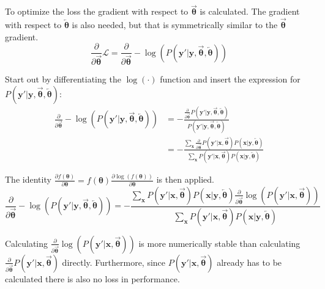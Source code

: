 To optimize the loss the gradient with respect to $\overrightarrow{\boldsymbol\theta}$ is calculated. The gradient with respect to $\overleftarrow{\boldsymbol\theta}$ is also needed, but that is symmetrically similar to the $\overrightarrow{\boldsymbol\theta}$ gradient.
\begin{equation}
\frac{\partial}{\partial \overrightarrow{\boldsymbol\theta}} \mathcal{L} = \frac{\partial}{\partial \overrightarrow{\boldsymbol\theta}} -\log(P(\mathbf{y}'|\mathbf{y}, \overrightarrow{\boldsymbol\theta}, \overleftarrow{\boldsymbol\theta}))
\end{equation}

Start out by differentiating the $\log(\cdot)$ function and insert the expression for $P(\mathbf{y}'|\mathbf{y}, \overrightarrow{\boldsymbol\theta}, \overleftarrow{\boldsymbol\theta})$:
\begin{equation}
\begin{aligned}
\frac{\partial}{\partial \overrightarrow{\boldsymbol\theta}} -\log(P(\mathbf{y}'|\mathbf{y}, \overrightarrow{\boldsymbol\theta}, \overleftarrow{\boldsymbol\theta}))
&= - \frac{\frac{\partial}{\partial \overrightarrow{\boldsymbol\theta}} P(\mathbf{y}'|\mathbf{y}, \overrightarrow{\boldsymbol\theta}, \overleftarrow{\boldsymbol\theta})}{P(\mathbf{y}'|\mathbf{y}, \overrightarrow{\boldsymbol\theta}, \overleftarrow{\boldsymbol\theta})} \\
&= - \frac{\sum_{\mathbf{x}} \frac{\partial}{\partial \overrightarrow{\boldsymbol\theta}} P(\mathbf{y}'|\mathbf{x}, \overrightarrow{\boldsymbol\theta}) P(\mathbf{x}|\mathbf{y}, \overleftarrow{\boldsymbol\theta})}{\sum_{\mathbf{x}} P(\mathbf{y}'|\mathbf{x}, \overrightarrow{\boldsymbol\theta}) P(\mathbf{x}|\mathbf{y}, \overleftarrow{\boldsymbol\theta})}
\end{aligned}
\end{equation}

The identity $\frac{\partial f({\boldsymbol\theta})}{\partial {\boldsymbol\theta}} = f({\boldsymbol\theta}) \frac{\partial \log(f({\boldsymbol\theta}))}{\partial {\boldsymbol\theta}}$ is then applied.
\begin{equation}
\frac{\partial}{\partial \overrightarrow{\boldsymbol\theta}} -\log(P(\mathbf{y}'|\mathbf{y}, \overrightarrow{\boldsymbol\theta}, \overleftarrow{\boldsymbol\theta})) = - \frac{\sum_{\mathbf{x}} P(\mathbf{y}'|\mathbf{x}, \overrightarrow{\boldsymbol\theta}) P(\mathbf{x}|\mathbf{y}, \overleftarrow{\boldsymbol\theta}) \frac{\partial}{\partial \overrightarrow{\boldsymbol\theta}} \log(P(\mathbf{y}'|\mathbf{x}, \overrightarrow{\boldsymbol\theta})) }{\sum_{\mathbf{x}} P(\mathbf{y}'|\mathbf{x}, \overrightarrow{\boldsymbol\theta}) P(\mathbf{x}|\mathbf{y}, \overleftarrow{\boldsymbol\theta})}
\end{equation}

Calculating $\frac{\partial}{\partial \overrightarrow{\boldsymbol\theta}} \log(P(\mathbf{y}'|\mathbf{x}, \overrightarrow{\boldsymbol\theta}))$ is more numerically stable than calculating $\frac{\partial}{\partial \overrightarrow{\boldsymbol\theta}} P(\mathbf{y}'|\mathbf{x}, \overrightarrow{\boldsymbol\theta})$ directly. Furthermore, since $P(\mathbf{y}'|\mathbf{x}, \overrightarrow{\boldsymbol\theta})$ already has to be calculated there is also no loss in performance.
